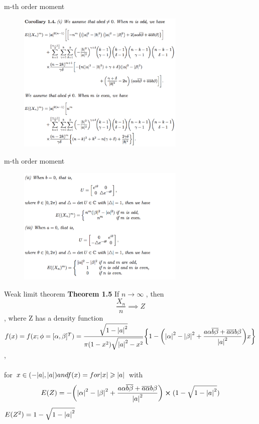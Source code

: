 \documentclass[xcolor=svgnames]{beamer}
\def\geq{\geqslant}
\begin{document}
\begin{frame}{m-th order moment}
    \begin{figure}
    \centering
    \includegraphics[width = 8cm]{Thm2.png}
\end{figure}
\end{frame}
\begin{frame}{m-th order moment}
    \begin{figure}
    \centering
    \includegraphics[width = 8cm]{Thm2_1.png}
\end{figure}
\end{frame}

\begin{frame}{Weak limit theorem}
\textbf{Theorem 1.5} If $n \rightarrow \infty$ , then 
                        $$ \frac{X_n}{n} \implies Z$$,
where Z has a density function\\

 $f(x) = f(x ; \phi = [\alpha, \beta]^T)
 = \dfrac{\sqrt{1-\abs{a}^2}}{\pi(1-x^2)\sqrt{\abs{a}^2 - x^2}}
 \bigg \{
 1-\bigg(\abs{\alpha}^2 -\abs{\beta}^2 +
 \dfrac{a\alpha\overline{b\beta} + \overline{a\alpha}b\beta}{\abs{a}^2}\bigg)x\bigg \}$, \\
 \\
 for $ x \in (-\abs{a},\abs{a}) and f(x) =  for \abs{x} \geq \abs{a}$ with\\
 $$E(Z) = -\bigg(\abs{\alpha}^2 -\abs{\beta}^2 + \dfrac{a\alpha\overline{b\beta} + \overline{a\alpha}b\beta}{\abs{a}^2}\bigg) \cross (1-\sqrt{1-\abs{a}^2})$$
 \hspace{3.25cm}$E(Z^2) = 1 - \sqrt{1-\abs{a}^2}$
    
\end{frame}
\end{document}
